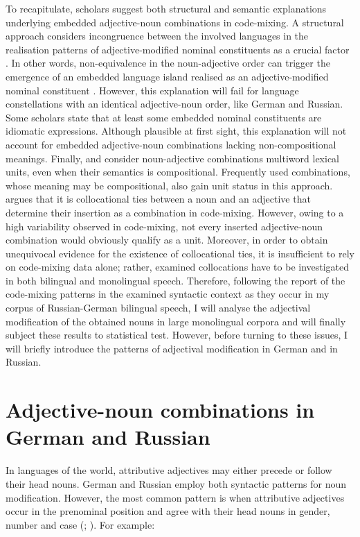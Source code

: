 To recapitulate, scholars suggest both structural and semantic explanations underlying embedded adjective-noun combinations in code-mixing. A structural approach considers incongruence between the involved languages in the realisation patterns of adjective-modified nominal constituents as a crucial factor \citep{myers-scotton-matching-1995, myers-scotton-contact-2002}. In other words, non-equivalence in the noun-adjective order can trigger the emergence of an embedded language island realised as an adjective-modified nominal constituent \citep{deuchar-congruence-2005}. However, this explanation will fail for language constellations with an identical adjective-noun order, like German and Russian. Some scholars \citep[e.g.,][]{poplack-meechan-1995} state that at least some embedded nominal constituents are idiomatic expressions. Although plausible at first sight, this explanation will not account for embedded adjective-noun combinations lacking non-compositional meanings. Finally, \citet[][]{backus-two-1996} and \citet[][]{boumans-syntax-1998} consider noun-adjective combinations multiword lexical units, even when their semantics is compositional. Frequently used combinations, whose meaning may be compositional, also gain unit status in this approach. \citet{boumans-syntax-1998} argues that it is collocational ties between a noun and an adjective that determine their insertion as a combination in code-mixing.  However, owing to a high variability observed in code-mixing, not every inserted adjective-noun combination would obviously qualify as a unit. Moreover, in order to obtain unequivocal evidence for the existence of collocational ties, it is insufficient to rely on code-mixing data alone; rather, examined collocations have to be investigated in both bilingual and monolingual speech. Therefore, following the report of the code-mixing patterns in the examined syntactic context as they occur in my corpus of Russian-German bilingual speech, I will analyse the adjectival modification of the obtained nouns in large monolingual corpora and will finally subject these results to statistical test. However, before turning to these issues, I will briefly introduce the patterns of adjectival modification in German and in Russian.

\section{Adjective-noun combinations in German and Russian}
In languages of the world, attributive adjectives may either precede or follow their head nouns. German and Russian employ both syntactic patterns for noun modification. However, the most common pattern is when attributive adjectives occur in the prenominal position and agree with their head nouns in gender, number and case (\citealt[1303]{rusgramm-tom1}; \citealt[232]{eisenberg-satz-1999}). For example:

